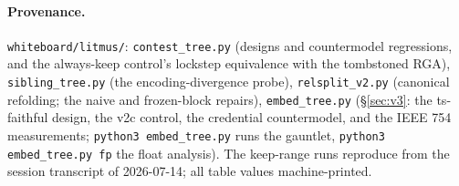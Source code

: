 \documentclass[11pt]{article}
\begin{document}
\paragraph{Provenance.} \texttt{whiteboard/litmus/}:
\texttt{contest\_tree.py} (designs and countermodel regressions, and the
always-keep control's lockstep equivalence with the tombstoned RGA),
\texttt{sibling\_tree.py} (the encoding-divergence probe),
\texttt{relsplit\_v2.py} (canonical refolding; the naive and
frozen-block repairs), \texttt{embed\_tree.py} (\S\ref{sec:v3}: the
ts-faithful design, the v2c control, the credential countermodel, and
the IEEE 754 measurements; \texttt{python3 embed\_tree.py} runs the
gauntlet, \texttt{python3 embed\_tree.py fp} the float analysis). The
keep-range runs reproduce from the session transcript of 2026-07-14; all
table values machine-printed.
\end{document}
